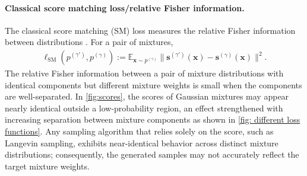 \documentclass[11pt]{article}
\newcommand{\vect}[1]{\mathbf{#1}}
\theoremstyle{plain}
\newcommand{\1}{\mathbbm{1}}
\newcommand{\vx}{\vect{x}}
\newcommand{\lsm}{\ell_\mathrm{SM}}
\newcommand{\pdist}[2][]{p_{#1}^{(#2)}}
\newcommand{\score}[2][]{\vect{s}_{#1}^{(#2)}}
\begin{document}
\paragraph{Classical score matching loss/relative Fisher information.} The classical score matching (SM) loss measures the relative Fisher information between distributions \citep{10.5555/1046920.1088696}. For a pair of mixtures, %
\begin{align}
    \lsm(\pdist{\gamma'},\pdist{\gamma}) := \mathbb{E}_{\vx \sim \pdist{\gamma}} \|\score{\gamma'}(\vx)-\score{\gamma}(\vx) \|^2.
\end{align}
The relative Fisher information between a pair of mixture distributions with identical components but different mixture weights is small when the components are well-separated. In \cref{fig:scores}, the scores of Gaussian mixtures may appear nearly identical outside a low-probability region, an effect strengthened with increasing separation between mixture components as shown in \cref{fig: different loss functions}.   %
Any sampling algorithm that relies solely on the score, such as Langevin sampling, exhibits near-identical behavior across distinct mixture distributions; consequently, the generated samples may not accurately reflect the target mixture weights.  %
\end{document}
